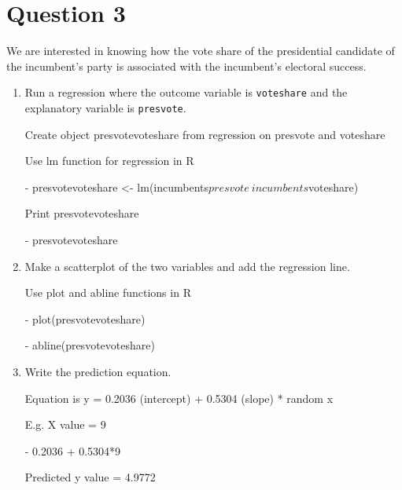 \documentclass[12pt,letterpaper]{article}
\begin{document}
\section*{Question 3}%

\noindent We are interested in knowing how the vote share of the presidential candidate of the incumbent's party is associated with the incumbent's electoral success.
	\vspace{.25cm}
	\begin{enumerate}
		\item Run a regression where the outcome variable is \texttt{voteshare} and the explanatory variable is \texttt{presvote}.
			\vspace{5cm}
			
		Create object presvotevoteshare from regression on presvote and voteshare
		
		Use lm function for regression in R
		
		- presvotevoteshare <- lm(incumbents$presvote ~ incumbents$voteshare)
	
	Print presvotevoteshare	
	
	-	presvotevoteshare	
	
		\item Make a scatterplot of the two variables and add the regression line. 
			\vspace{5cm}
			
			Use plot and abline functions in R
	
		-	plot(presvotevoteshare)
		
		-	abline(presvotevoteshare)
		
		\item Write the prediction equation.
		
		Equation is y = 0.2036 (intercept) + 0.5304 (slope) * random x 
		
		E.g.  X value = 9
		 
		- 0.2036 + 0.5304*9
		
		Predicted y value = 4.9772
		
	\end{enumerate}
	

\newpage	
\end{document}
